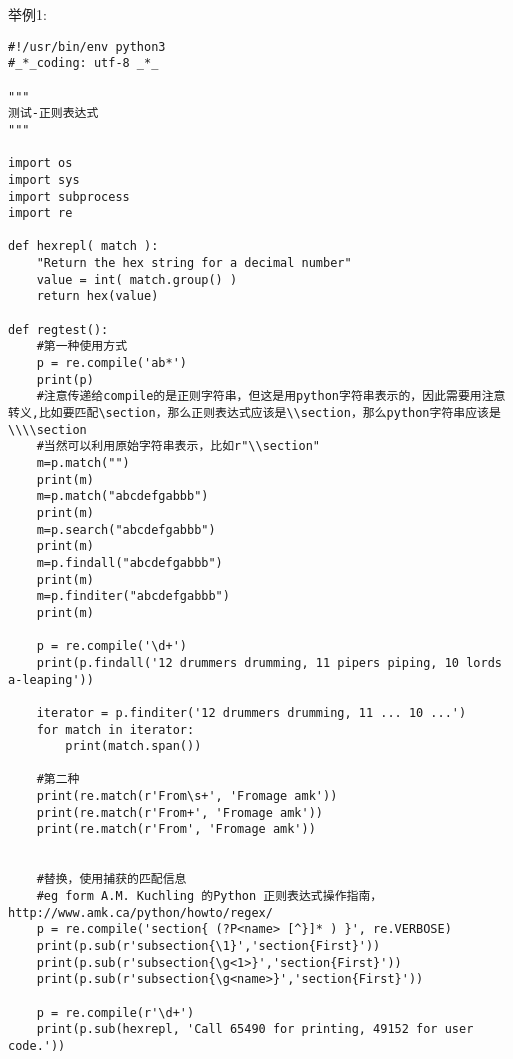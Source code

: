 \documentclass[twoside,11pt]{book}
\begin{document}
举例1:
\begin{lstlisting}
#!/usr/bin/env python3
#_*_coding: utf-8 _*_

"""
测试-正则表达式
"""

import os
import sys
import subprocess
import re

def hexrepl( match ):
    "Return the hex string for a decimal number"
    value = int( match.group() )
    return hex(value)

def regtest():
    #第一种使用方式
    p = re.compile('ab*')
    print(p)
    #注意传递给compile的是正则字符串，但这是用python字符串表示的，因此需要用注意转义,比如要匹配\section，那么正则表达式应该是\\section，那么python字符串应该是\\\\section
    #当然可以利用原始字符串表示，比如r"\\section"
    m=p.match("")
    print(m)
    m=p.match("abcdefgabbb")
    print(m)
    m=p.search("abcdefgabbb")
    print(m)
    m=p.findall("abcdefgabbb")
    print(m)
    m=p.finditer("abcdefgabbb")
    print(m)

    p = re.compile('\d+')
    print(p.findall('12 drummers drumming, 11 pipers piping, 10 lords a-leaping'))

    iterator = p.finditer('12 drummers drumming, 11 ... 10 ...')
    for match in iterator:
        print(match.span())

    #第二种
    print(re.match(r'From\s+', 'Fromage amk'))
    print(re.match(r'From+', 'Fromage amk'))
    print(re.match(r'From', 'Fromage amk'))


    #替换，使用捕获的匹配信息
    #eg form A.M. Kuchling 的Python 正则表达式操作指南，http://www.amk.ca/python/howto/regex/
    p = re.compile('section{ (?P<name> [^}]* ) }', re.VERBOSE)
    print(p.sub(r'subsection{\1}','section{First}'))
    print(p.sub(r'subsection{\g<1>}','section{First}'))
    print(p.sub(r'subsection{\g<name>}','section{First}'))

    p = re.compile(r'\d+')
    print(p.sub(hexrepl, 'Call 65490 for printing, 49152 for user code.'))


\end{lstlisting}
\end{document}
